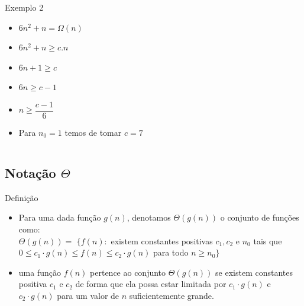 \documentclass{beamer}
\begin{document}
 
  \begin{frame}
    \begin{columns}
%
        \begin{block}{Exemplo 2}
         \begin{itemize}
          \item $6n^2 + n = \Omega(n)$ 
          \item $6n^2+n \geq c.n$
          \item $6n + 1 \geq c$
          \item $6n \geq c-1$
          \item $n \geq \dfrac{c-1}{6}$
          \item Para $n_0 =  1$ temos de tomar $c=7$
         \end{itemize}

         
        \end{block}

        
       
        \end{columns}

 \end{frame}
 
 
 \subsection{Notação $\Theta$}
\begin{frame}
    \begin{block}{Definição}
     \begin{itemize}
      \item Para uma dada função $g(n)$, denotamos $\Theta(g(n))$ o conjunto de funções como:\\
      $\Theta(g(n)) = $ $\{ f(n):$ existem constantes positivas $c_1,c_2$ e $n_0$ tais que $0\leq  c_1\cdot g(n) \leq f(n) \leq c_2\cdot g(n)$ para todo $n \geq n_0 \}$
      \item uma função $f(n)$ pertence ao conjunto $\Theta(g(n))$ se existem constantes positiva $c_1$ e $c_2$ de forma que ela possa estar limitada por $c_1\cdot g(n)$ e $c_2\cdot g(n)$ para um valor de $n$ suficientemente grande.
     
     \end{itemize}

    \end{block}

 \end{frame}
 
\end{document}
